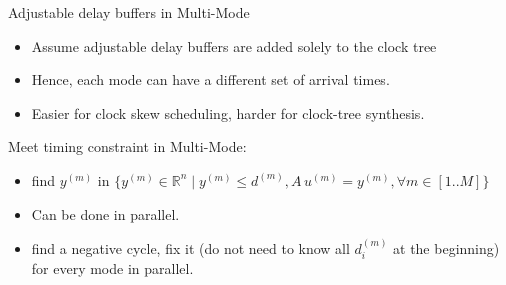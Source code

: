 \documentclass[10pt,ignorenonframetext,mathserif,onlymath]{beamer}
\providecommand{\tightlist}{%
  \setlength{\itemsep}{0pt}\setlength{\parskip}{0pt}}
\begin{document}
\begin{frame}{Adjustable delay buffers in Multi-Mode}
\protect\hypertarget{adjustable-delay-buffers-in-multi-mode}{}

\begin{itemize}
\tightlist
\item
  Assume adjustable delay buffers are added solely to the clock tree
\item
  Hence, each mode can have a different set of arrival times.
\item
  Easier for clock skew scheduling, harder for clock-tree synthesis.
\end{itemize}

\end{frame}

\begin{frame}{Meet timing constraint in Multi-Mode:}
\protect\hypertarget{meet-timing-constraint-in-multi-mode}{}

\begin{itemize}
\tightlist
\item
  find \(y^{(m)}\) in
  \(\{y^{(m)} \in \mathbb{R}^n \mid y^{(m)} \leq d^{(m)}, A\,u^{(m)} = y^{(m)}, \forall m\in[1..M]\}\)
\item
  Can be done in parallel.
\item
  find a negative cycle, fix it (do not need to know all \(d_i^{(m)}\)
  at the beginning) for every mode in parallel.
\end{itemize}

\end{frame}
\end{document}
